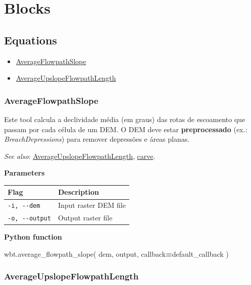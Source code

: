\documentclass[
]{book}
\newenvironment{Shaded}{\begin{snugshade}}{\end{snugshade}}
\newcommand{\NormalTok}[1]{#1}
\newcommand{\OperatorTok}[1]{\textcolor[rgb]{0.81,0.36,0.00}{\textbf{#1}}}
\providecommand{\tightlist}{%
  \setlength{\itemsep}{0pt}\setlength{\parskip}{0pt}}
\theoremstyle{definition}
\theoremstyle{definition}
\theoremstyle{definition}
\theoremstyle{definition}
\theoremstyle{remark}
\begin{document}
\chapter{Blocks}\label{blocks}

\section{Equations}\label{equations}

\begin{itemize}
\tightlist
\item
  \hyperref[AverageFlowpathSlope]{AverageFlowpathSlope}
\item
  \hyperref[AverageUpslopeFlowpathLength]{AverageUpslopeFlowpathLength}
\end{itemize}

\subsection{AverageFlowpathSlope}\label{AverageFlowpathSlope}

Este tool calcula a declividade média (em graus) das rotas de escoamento que passam por cada célula de um DEM.
O DEM deve estar \textbf{preprocessado} (ex.: \emph{BreachDepressions}) para remover depressões e áreas planas.

\emph{See also}: \hyperref[AverageUpslopeFlowpathLength]{AverageUpslopeFlowpathLength}, \hyperref[carve]{carve}.

\textbf{Parameters}

\begin{longtable}[]{@{}ll@{}}
\toprule\noalign{}
Flag & Description \\
\midrule\noalign{}
\endhead
\bottomrule\noalign{}
\endlastfoot
\texttt{-i,\ -\/-dem} & Input raster DEM file \\
\texttt{-o,\ -\/-output} & Output raster file \\
\end{longtable}

\textbf{Python function}

\begin{Shaded}
\begin{Highlighting}[]
\NormalTok{wbt.average\_flowpath\_slope(}
\NormalTok{    dem,}
\NormalTok{    output,}
\NormalTok{    callback}\OperatorTok{=}\NormalTok{default\_callback}
\NormalTok{)}
\end{Highlighting}
\end{Shaded}

\subsection{AverageUpslopeFlowpathLength}\label{AverageUpslopeFlowpathLength}
\end{document}
